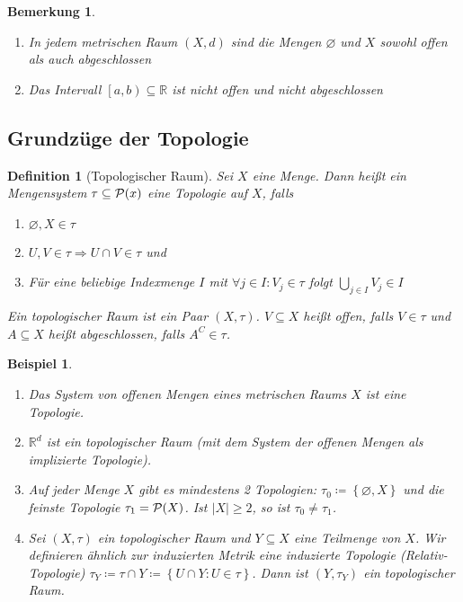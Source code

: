 \documentclass[11pt, twoside, a4paper]{article}
\theoremstyle{plain}
\newtheorem{bemerkung}[blockelement]{Bemerkung}
\newtheorem{definition}[blockelement]{Definition}
\newtheorem{beispiel}[blockelement]{Beispiel}
\numberwithin{equation}{subsection}
\newcommand{\set}[1]{\left\{#1\right\}}
\newcommand{\pair}[1]{\left(#1\right)}
\newcommand{\of}[1]{\mathopen{}\mathclose{}\bgroup\left(#1\aftergroup\egroup\right)}
\newcommand{\abs}[1]{\left\lvert#1\right\rvert}
\newcommand{\linterv}[1]{\left[#1\right)}
\newcommand{\impl}[0]{\Rightarrow{}}
\renewcommand{\emptyset}{\varnothing}
\newcommand{\sbset}{\subseteq}
\newcommand{\theoremescape}{\leavevmode}
\newcommand{\R}{\mathbb{R}}
\begin{document}
    \begin{bemerkung}
        \theoremescape
        \begin{enumerate}[label=(\alph*)]
            \item In jedem metrischen Raum $\pair{X, d}$ sind die Mengen $\emptyset$ und $X$ sowohl offen als auch abgeschlossen
            \item Das Intervall $\linterv{a,b}\subseteq\R$ ist nicht offen und nicht abgeschlossen
        \end{enumerate}
    \end{bemerkung}

    \subsection{Grundzüge der Topologie}

    \begin{definition}[Topologischer Raum]
        Sei $X$ eine Menge. Dann heißt ein Mengensystem $\tau\sbset\mathcal{P}\of{x}$ eine \emph{Topologie} auf $X$, falls
        \begin{enumerate}[label=(\roman*)]
            \item $\emptyset, X\in\tau$
            \item $U, V\in \tau \impl U \cap V \in \tau$ und
            \item Für eine beliebige Indexmenge $I$ mit $\forall j\in I\colon V_j \in \tau$ folgt $\displaystyle\bigcup_{j\in I} V_j \in I$
        \end{enumerate}
        Ein topologischer Raum ist ein Paar $\pair{X, \tau}$. $V\subseteq X$ heißt offen, falls $V\in\tau$ und $A\subseteq X$ heißt abgeschlossen, falls $A^{C} \in\tau$.
    \end{definition}

    \begin{beispiel}
        \theoremescape
        \begin{enumerate}
            \item Das System von offenen Mengen eines metrischen Raums $X$ ist eine Topologie.
            \item $\R^d$ ist ein topologischer Raum (mit dem System der offenen Mengen als implizierte Topologie).
            \item Auf jeder Menge $X$ gibt es mindestens 2 Topologien: $\tau_0 \coloneqq \set{\emptyset, X}$ und die feinste Topologie $\tau_1 = \mathcal{P}\of{X}$. Ist $\abs{X} \geq 2$, so ist $\tau_0 \neq \tau_1$.
            \item Sei $\pair{X, \tau}$ ein topologischer Raum und $Y\subseteq X$ eine Teilmenge von $X$. Wir definieren ähnlich zur induzierten Metrik eine \emph{induzierte Topologie} (Relativ-Topologie) $\tau_Y \coloneqq \tau \cap Y \coloneqq \set{U \cap Y \colon U\in \tau}$. Dann ist $\pair{Y, \tau_Y}$ ein topologischer Raum.
        \end{enumerate}
    \end{beispiel}
\end{document}
